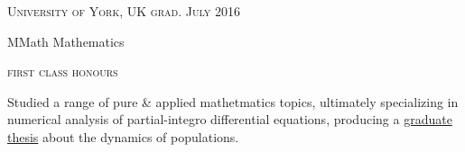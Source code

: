 {\raggedright
  \textsc{\small{University of York, UK
    \hfill
    {\raggedleft
      grad. July 2016
    }
  }}

  {\raggedright\large {
    MMath Mathematics
  } \\}

  \textsc{\small{first class honours}}

  \normalsize{
    Studied a range of pure \& applied mathetmatics topics, ultimately specializing in numerical analysis of partial-integro differential equations, producing a \href{https://github.com/LukeSheard/senior_thesis}{graduate thesis} about the dynamics of populations. 
  }

  \vspace{8pt}
}
